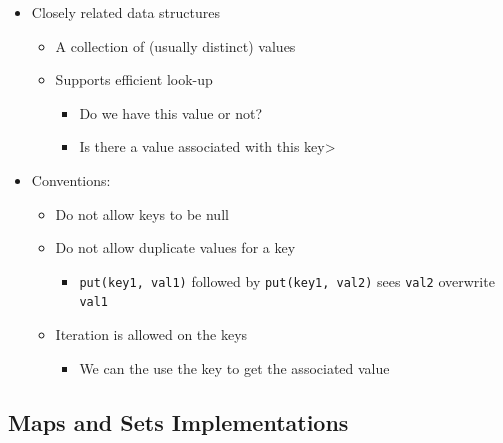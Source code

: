 \documentclass[
  10pt,
  english,
  letterpaper,
,tablecaptionabove
]{scrartcl}
\newcommand{\passthrough}[1]{#1}
\providecommand{\tightlist}{%
  \setlength{\itemsep}{0pt}\setlength{\parskip}{0pt}}
\begin{document}
\begin{itemize}
\tightlist
\item
  Closely related data structures

  \begin{itemize}
  \tightlist
  \item
    A collection of (usually distinct) values
  \item
    Supports efficient look-up

    \begin{itemize}
    \tightlist
    \item
      Do we have this value or not?
    \item
      Is there a value associated with this key\textgreater{}
    \end{itemize}
  \end{itemize}
\item
  Conventions:

  \begin{itemize}
  \tightlist
  \item
    Do not allow keys to be null
  \item
    Do not allow duplicate values for a key

    \begin{itemize}
    \tightlist
    \item
      \passthrough{\lstinline!put(key1, val1)!} followed by
      \passthrough{\lstinline!put(key1, val2)!} sees
      \passthrough{\lstinline!val2!} overwrite
      \passthrough{\lstinline!val1!}
    \end{itemize}
  \item
    Iteration is allowed on the keys

    \begin{itemize}
    \tightlist
    \item
      We can the use the key to get the associated value
    \end{itemize}
  \end{itemize}
\end{itemize}

\hypertarget{maps-and-sets-implementations}{%
\subsection{Maps and Sets
Implementations}\label{maps-and-sets-implementations}}
\end{document}
